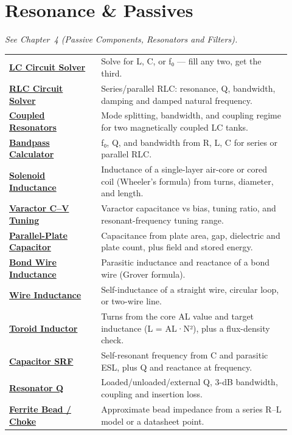 \section*{Resonance \& Passives}
\noindent\emph{See Chapter~4 (Passive Components, Resonators and Filters).}
\begin{longtable}{>{\raggedright\arraybackslash}p{0.30\linewidth}>{\raggedright\arraybackslash}p{0.62\linewidth}}
\hline
\href{https://rftoolbox.ca/LC.html}{\textbf{LC Circuit Solver}} & Solve for L, C, or f₀ — fill any two, get the third. \\
\href{https://rftoolbox.ca/RLCCircuit.html}{\textbf{RLC Circuit Solver}} & Series/parallel RLC: resonance, Q, bandwidth, damping and damped natural frequency. \\
\href{https://rftoolbox.ca/CoupledResonators.html}{\textbf{Coupled Resonators}} & Mode splitting, bandwidth, and coupling regime for two magnetically coupled LC tanks. \\
\href{https://rftoolbox.ca/BandpassCalc.html}{\textbf{Bandpass Calculator}} & f₀, Q, and bandwidth from R, L, C for series or parallel RLC. \\
\href{https://rftoolbox.ca/Solenoid.html}{\textbf{Solenoid Inductance}} & Inductance of a single-layer air-core or cored coil (Wheeler's formula) from turns, diameter, and length. \\
\href{https://rftoolbox.ca/Varactor.html}{\textbf{Varactor C–V Tuning}} & Varactor capacitance vs bias, tuning ratio, and resonant-frequency tuning range. \\
\href{https://rftoolbox.ca/ParallelPlateCap.html}{\textbf{Parallel-Plate Capacitor}} & Capacitance from plate area, gap, dielectric and plate count, plus field and stored energy. \\
\href{https://rftoolbox.ca/BondWire.html}{\textbf{Bond Wire Inductance}} & Parasitic inductance and reactance of a bond wire (Grover formula). \\
\href{https://rftoolbox.ca/WireInductance.html}{\textbf{Wire Inductance}} & Self-inductance of a straight wire, circular loop, or two-wire line. \\
\href{https://rftoolbox.ca/ToroidInductor.html}{\textbf{Toroid Inductor}} & Turns from the core AL value and target inductance (L = AL·N²), plus a flux-density check. \\
\href{https://rftoolbox.ca/CapacitorSRF.html}{\textbf{Capacitor SRF}} & Self-resonant frequency from C and parasitic ESL, plus Q and reactance at frequency. \\
\href{https://rftoolbox.ca/ResonatorQ.html}{\textbf{Resonator Q}} & Loaded/unloaded/external Q, 3-dB bandwidth, coupling and insertion loss. \\
\href{https://rftoolbox.ca/FerriteBead.html}{\textbf{Ferrite Bead / Choke}} & Approximate bead impedance from a series R–L model or a datasheet point. \\
\hline
\end{longtable}

